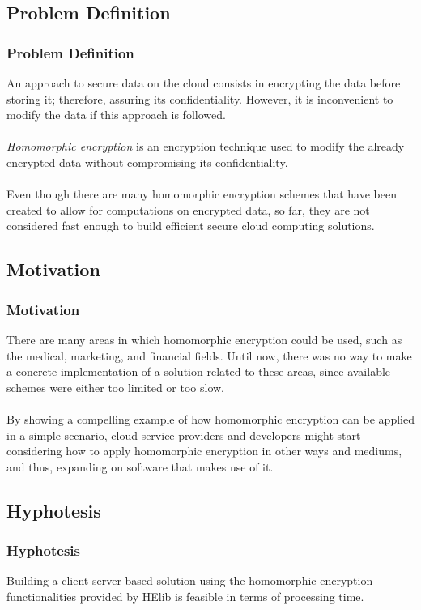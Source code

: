 \documentclass{beamer}
\begin{document}
\subsection{Problem Definition} %

\begin{frame}
\frametitle{Problem Definition}

An approach to secure data on the cloud consists in encrypting the data before storing it; therefore, assuring its confidentiality. However, it is inconvenient to modify the data if this approach is followed. \\~\\

\emph{Homomorphic encryption} is an encryption technique used to modify the already encrypted data without compromising its confidentiality. \\~\\

Even though there are many homomorphic encryption schemes that have been created to allow for computations on encrypted data, so far, they are not considered fast enough to build efficient secure cloud computing solutions. 

\end{frame}

\subsection{Motivation}
\begin{frame}
\frametitle{Motivation}

There are many areas in which homomorphic encryption could be used, such as the medical, marketing, and financial fields. Until now, there was no way to make a concrete implementation of a solution related to these areas, since available schemes were either too limited or too slow. \\~\\

By showing a compelling example of how homomorphic encryption can be applied in a simple scenario, cloud service providers and developers might start considering how to apply homomorphic encryption in other ways and mediums, and thus, expanding on software that makes use of it.
\end{frame}
\subsection{Hyphotesis}
\begin{frame}
\frametitle{Hyphotesis}

Building a client-server based solution using the homomorphic encryption functionalities provided by HElib is feasible in terms of processing time.

\end{frame}
\end{document}
